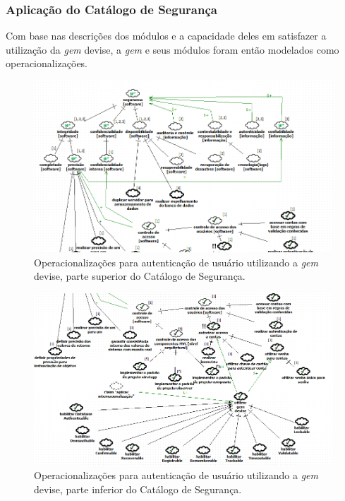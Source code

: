 \subsubsection{Aplicação do Catálogo de Segurança}

Com base nas descrições dos módulos e a capacidade deles em satisfazer a utilização da \textit{gem} devise, a \textit{gem} e seus módulos foram então modelados como operacionalizações.

\begin{figure}[h!]
	\centering
	\includegraphics[keepaspectratio=true,scale=0.7]{figuras/catalogoPersona1-1.PNG}
	\caption{Operacionalizações para autenticação de usuário utilizando a \textit{gem} devise, parte superior do Catálogo de Segurança.}
	\label{catalogoPersona1}
\end{figure}

\begin{figure}[h!]
	\centering
	\includegraphics[keepaspectratio=true,scale=0.7]{figuras/catalogoPersona1-2.PNG}
	\caption{Operacionalizações para autenticação de usuário utilizando a \textit{gem} devise, parte inferior do Catálogo de Segurança.}
	\label{catalogoPersona2-2}
\end{figure}

